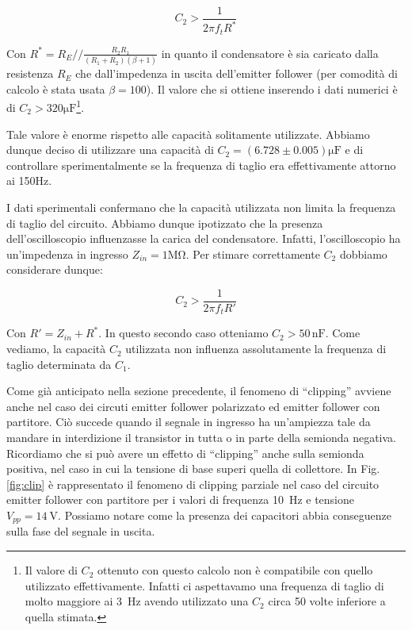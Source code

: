 \begin{equation}
C_2>\frac{1}{2\pi f_t R^*}
\end{equation}

Con $R^*=R_E//\frac{R_2R_1}{(R_1+R_2)(\beta +1)}$ in quanto il condensatore è sia caricato dalla resistenza $R_E$ che dall'impedenza in uscita dell'emitter follower (per comodità di calcolo è stata usata $\beta=100$). Il valore che si ottiene inserendo i dati numerici è di $C_2>320\si{\micro\farad}$\footnote{Il valore di $C_2$ ottenuto con questo calcolo non è compatibile con quello utilizzato effettivamente. Infatti ci aspettavamo una frequenza di taglio di molto maggiore ai \SI{3}{\hertz} avendo utilizzato una $C_2$ circa 50 volte inferiore a quella stimata.}.

Tale valore è enorme rispetto alle capacità solitamente utilizzate. Abbiamo dunque deciso di utilizzare una capacità di $C_2=(6.728 \pm 0.005)\si{\micro\farad}$ e di controllare sperimentalmente se la frequenza di taglio era effettivamente attorno ai 150\si{\hertz}.

I dati sperimentali confermano che la capacità utilizzata non limita la frequenza di taglio del circuito. Abbiamo dunque ipotizzato che la presenza dell'oscilloscopio influenzasse la carica del condensatore. Infatti, l'oscilloscopio ha un'impedenza in ingresso $Z_{in}=1\si{\mega\ohm}$. Per stimare correttamente $C_2$ dobbiamo considerare dunque: 

$$C_2>\frac{1}{2\pi f_t R'}$$

Con $R'=Z_{in}+R^*$. In questo secondo caso otteniamo $C_2>50\,\si{\nano\farad}$.
Come vediamo, la capacità $C_2$ utilizzata non influenza assolutamente la frequenza di taglio determinata da $C_1$. 


Come già anticipato nella sezione precedente, il fenomeno di ``clipping'' avviene anche nel caso dei circuti emitter follower polarizzato ed emitter follower con partitore.
Ciò succede quando il segnale in ingresso ha un'ampiezza tale da mandare in interdizione il transistor in tutta o in parte  della semionda negativa. Ricordiamo che si può avere un effetto di ``clipping'' anche sulla semionda positiva, nel caso in cui la tensione di base superi quella di collettore. 
In Fig. \ref{fig:clip} è rappresentato il fenomeno di clipping parziale nel caso del circuito emitter follower con partitore per i valori di frequenza \SI{10}{\hertz} e tensione $V_{pp} = \SI{14}{\volt}$. Possiamo notare come la presenza dei capacitori abbia conseguenze sulla fase del segnale in uscita.


